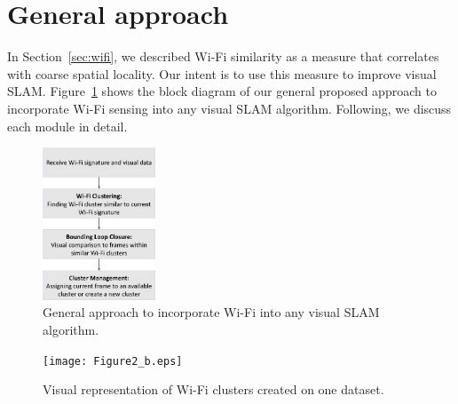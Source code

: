 \section{General approach}
\label{sec:slam}
In Section~\ref{sec:wifi}, we described Wi-Fi similarity as a measure that correlates with coarse spatial locality. Our intent is to use this measure to improve visual SLAM. Figure~\ref{fig:gen_approach} shows the block diagram of our general proposed approach to incorporate Wi-Fi sensing into any visual SLAM algorithm. Following, we discuss each module in detail.
\begin{figure}
	\centering
	\includegraphics[width=0.3\textwidth]{Figure2_a.eps}
	\caption{General approach to incorporate Wi-Fi into any visual SLAM algorithm.}
\label{fig:gen_approach}
\end{figure}
\begin{figure}
	\centering
	\texttt{[image: Figure2\_b.eps]}
	\caption{Visual representation of Wi-Fi clusters created on one dataset.}
\label{fig:cluster_rep}
\end{figure}

